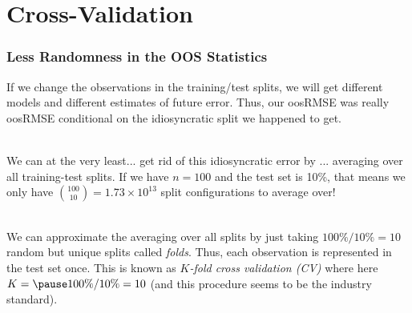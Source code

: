 \documentclass[handout]{beamer}
\begin{document}
\section{Cross-Validation}

\begin{frame}\frametitle{Less Randomness in the OOS Statistics}

If we change the observations in the training/test splits, we will get different models and different estimates of future error. \pause Thus, our oosRMSE was really oosRMSE conditional on the idiosyncratic split we happened to get.\\~\\ \pause 

We can at the very least... \pause  get rid of this idiosyncratic error by ... \pause averaging over all training-test splits. If we have $n=100$ and the test set is 10\%, that means we only have $\binom{100}{10} = 1.73 \times 10^{13}$ split configurations to average over! \\~\\ \pause 

We can approximate the averaging over all splits by just taking $100\% / 10\% = 10$ random but unique splits called \emph{folds}. \pause Thus, each observation is represented in the test set once. This is known as \emph{$K$-fold cross validation (CV)} where here $K = \pause100\% / 10\% = 10$ (and this procedure seems to be the industry standard).
	
\end{frame}
\end{document}
